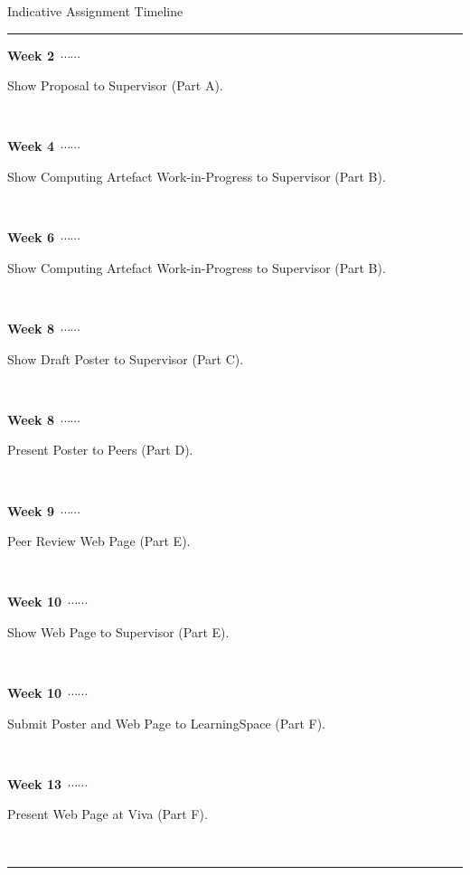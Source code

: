 \documentclass{../../fal_assignment}
\newcommand\ytl[2]{
\parbox[b]{8em}{\hfill{\color{cyan}\bfseries\sffamily #1}~$\cdots\cdots$~}\makebox[0pt][c]{$\bullet$}\vrule\quad \parbox[c]{4.5cm}{\vspace{7pt}\color{red!40!black!80}\raggedright\sffamily #2.\\[7pt]}\\[-3pt]}
\begin{document}
\begin{table}[!h]
\caption{Indicative Assignment Timeline}
\centering
\begin{minipage}[t]{.7\linewidth}
\color{gray}
\rule{\linewidth}{1pt}
\ytl{Week 2}{Show Proposal to Supervisor (Part A)}
\ytl{Week 4}{Show Computing Artefact Work-in-Progress to Supervisor (Part B)}
\ytl{Week 6}{Show Computing Artefact Work-in-Progress to Supervisor (Part B)}
\ytl{Week 8}{Show Draft Poster to Supervisor (Part C)}
\ytl{Week 8}{Present Poster to Peers (Part D)}
\ytl{Week 9}{Peer Review Web Page (Part E)}
\ytl{Week 10}{Show Web Page to Supervisor (Part E)}
\ytl{Week 10}{Submit Poster and Web Page to LearningSpace (Part F)}
\ytl{Week 13}{Present Web Page at Viva (Part F)}
\bigskip
\rule{\linewidth}{1pt}%
\end{minipage}%
\end{table}
\end{document}
